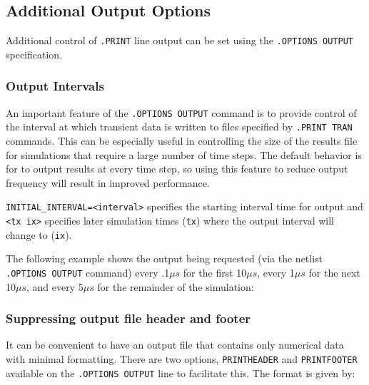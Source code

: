 \newpage
\subsection{Additional Output Options}
\label{Additional_Output}

Additional control of \texttt{.PRINT} line output can be set using the 
\texttt{.OPTIONS OUTPUT} specification.

\subsubsection{Output Intervals}
An important feature of the \texttt{.OPTIONS OUTPUT} command is to provide 
control of the interval at which transient data is written to files specified by 
\texttt{.PRINT TRAN} commands.  This can be
especially useful in controlling the size of the results file for
simulations that require a large number of time steps.  
The default behavior is for \Xyce{} to output results at every time step, so 
using this feature to reduce output frequency will result in improved performance.


\texttt{INITIAL\_INTERVAL=<interval>} specifies the starting interval time
for output and \texttt{<tx ix>} specifies later simulation times (\texttt{tx})
where the output interval will change to (\texttt{ix}).

The following example shows the output being requested (via the netlist
\texttt{.OPTIONS OUTPUT} command) every .1$\mu s$ for the first 10$\mu s$,
every 1$\mu s$ for the next 10$\mu s$, and every 5$\mu s$ for the remainder of
the simulation:


\subsubsection{Suppressing output file header and footer}

It can be convenient to have an output file that contains only numerical data with 
minimal formatting.  There are two options, \texttt{PRINTHEADER} and \texttt{PRINTFOOTER} 
available on the \texttt{.OPTIONS OUTPUT} line to facilitate this. The format
is given by:

